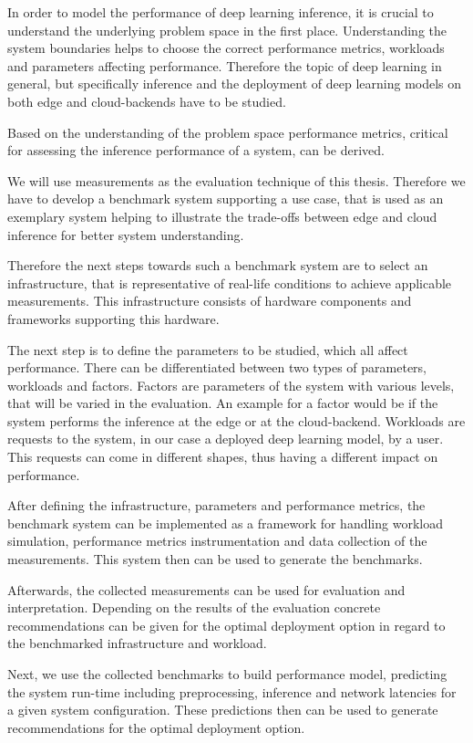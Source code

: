 In order to model the performance of deep learning inference, it is crucial to understand the underlying problem space in the first place.
Understanding the system boundaries helps to choose the correct performance metrics, workloads and parameters affecting performance.
Therefore the topic of deep learning in general, but specifically inference and the deployment of deep learning models on both edge and cloud-backends have to be studied.

Based on the understanding of the problem space performance metrics, critical for assessing the inference performance of a system, can be derived.

We will use measurements as the evaluation technique of this thesis. 
Therefore we have to develop a benchmark system supporting a use case, that is used as an exemplary system helping to illustrate the trade-offs between edge and cloud inference for better system understanding.

Therefore the next steps towards such a benchmark system are to select an infrastructure, that is representative of real-life conditions to achieve applicable measurements. 
This infrastructure consists of hardware components and frameworks supporting this hardware. 

The next step is to define the parameters to be studied, which all affect performance.
There can be differentiated between two types of parameters, workloads and factors.
Factors are parameters of the system with various levels, that will be varied in the evaluation. An example for a factor would be if the system performs the inference at the edge or at the cloud-backend.
Workloads are requests to the system, in our case a deployed deep learning model, by a user.
This requests can come in different shapes, thus having a different impact on performance.



After defining the infrastructure, parameters and performance metrics, the benchmark system can be implemented as a framework for handling workload simulation, performance metrics instrumentation and data collection of the measurements.
This system then can be used to generate the benchmarks. 

Afterwards, the collected measurements can be used for evaluation and interpretation.
Depending on the results of the evaluation concrete recommendations can be given for the optimal deployment option in regard to the benchmarked infrastructure and workload.

Next, we use the collected benchmarks to build performance model, predicting the system run-time including preprocessing, inference and network latencies for a given system configuration.
These predictions then can be used to generate recommendations for the optimal deployment option.

